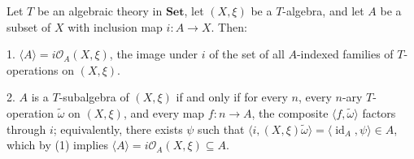 Let $T$ be an algebraic theory in $\mathbf{Set}$, let $(X, \xi)$ be a $T$-algebra, and let $A$ be a subset of $X$ with inclusion map $i \colon A \to X$. Then:

1. $\langle A \rangle = i \mathcal{O}_A(X, \xi)$, the image under $i$ of the set of all $A$-indexed families of $T$-operations on $(X, \xi)$.

2. $A$ is a $T$-subalgebra of $(X, \xi)$ if and only if for every $n$, every $n$-ary $T$-operation $\tilde{\omega}$ on $(X, \xi)$, and every map $f \colon n \to A$, the composite $\langle f, \tilde{\omega} \rangle$ factors through $i$; equivalently, there exists $\psi$ such that $\langle i, (X, \xi)\tilde{\omega} \rangle = \langle \operatorname{id}_A, \psi \rangle \in A$, which by (1) implies $\langle A \rangle = i \mathcal{O}_A(X, \xi) \subseteq A$.
